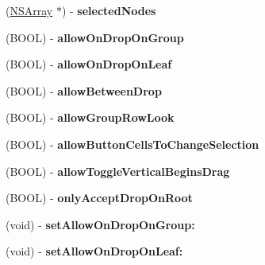 \begin{DoxyCompactItemize}
\item 
\hypertarget{interface_tree_controller_a7175132504fb8afa8210b8cbbefa8af5}{
(\hyperlink{class_n_s_array}{NSArray} $\ast$) -\/ {\bfseries selectedNodes}}
\label{interface_tree_controller_a7175132504fb8afa8210b8cbbefa8af5}

\item 
\hypertarget{interface_tree_controller_aacdf1cd1ab999e98a064c61f1a0e7568}{
(BOOL) -\/ {\bfseries allowOnDropOnGroup}}
\label{interface_tree_controller_aacdf1cd1ab999e98a064c61f1a0e7568}

\item 
\hypertarget{interface_tree_controller_a19e277591f2e432231e20fb84c83a5e2}{
(BOOL) -\/ {\bfseries allowOnDropOnLeaf}}
\label{interface_tree_controller_a19e277591f2e432231e20fb84c83a5e2}

\item 
\hypertarget{interface_tree_controller_a856333695158d6770e4f90defeddec8c}{
(BOOL) -\/ {\bfseries allowBetweenDrop}}
\label{interface_tree_controller_a856333695158d6770e4f90defeddec8c}

\item 
\hypertarget{interface_tree_controller_aed5d207d3cdfa28d4cde072bb2406a2c}{
(BOOL) -\/ {\bfseries allowGroupRowLook}}
\label{interface_tree_controller_aed5d207d3cdfa28d4cde072bb2406a2c}

\item 
\hypertarget{interface_tree_controller_a36367ff38188cc71cf0c11cc8ddd616a}{
(BOOL) -\/ {\bfseries allowButtonCellsToChangeSelection}}
\label{interface_tree_controller_a36367ff38188cc71cf0c11cc8ddd616a}

\item 
\hypertarget{interface_tree_controller_ae253a338b682b117a3a70e1bdd54fb3d}{
(BOOL) -\/ {\bfseries allowToggleVerticalBeginsDrag}}
\label{interface_tree_controller_ae253a338b682b117a3a70e1bdd54fb3d}

\item 
\hypertarget{interface_tree_controller_a055702edb19004ca4e604f0ae8812527}{
(BOOL) -\/ {\bfseries onlyAcceptDropOnRoot}}
\label{interface_tree_controller_a055702edb19004ca4e604f0ae8812527}

\item 
\hypertarget{interface_tree_controller_a27780957a4055d8b16b69bb56d837f80}{
(void) -\/ {\bfseries setAllowOnDropOnGroup:}}
\label{interface_tree_controller_a27780957a4055d8b16b69bb56d837f80}

\item 
\hypertarget{interface_tree_controller_abcf17a90cc4c47f490b1c349ab27cdff}{
(void) -\/ {\bfseries setAllowOnDropOnLeaf:}}
\label{interface_tree_controller_abcf17a90cc4c47f490b1c349ab27cdff}


\end{DoxyCompactItemize}
